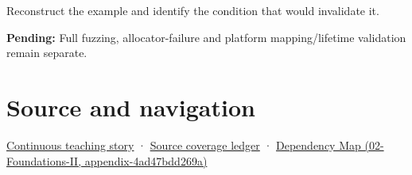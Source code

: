 Reconstruct the example and identify the condition that would invalidate it.

\textbf{Pending:} Full fuzzing, allocator-failure and platform mapping/lifetime validation remain separate.

\section{Source and navigation}\label{appendix-652d81568de9-source-and-navigation}

\href{Continuous\%20Notes/Computing\%20Foundations\%20-\%20From\%20Bits\%20to\%20C++\%20and\%20Systems\%20APIs\#Bytes\%20become\%20a\%20durable\%20agreement}{Continuous teaching story} · \hyperref[appendix-fd090d982a15]{Source coverage ledger} · \href{../02-Foundations-II/main.pdf\#nameddest=appendix-4ad47bdd269a}{Dependency Map (02-Foundations-II, appendix-4ad47bdd269a)}
